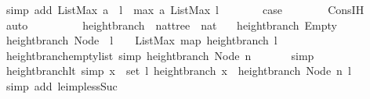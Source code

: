 \begin{isabellebody}
\ {\isacharparenleft}simp\ add{\isacharcolon}\ {\isacartoucheopen}ListMax\ {\isacharparenleft}a\ {\isacharhash}\ l{\isacharparenright}\ {\isacharequal}\ max\ a\ {\isacharparenleft}ListMax\ l{\isacharparenright}{\isacartoucheclose}{\isacharparenright}\isanewline
\ \ \ \ \isamarkupfalse%
\ \isamarkupfalse%
\ {\isacharquery}case\isanewline
\ \ \ \ \ \ \isamarkupfalse%
\ Cons{\isachardot}IH\ \isamarkupfalse%
\ auto\ \isanewline
\ \ \isamarkupfalse%
%
\endisatagproof
{\isafoldproof}%
%
\isadelimproof
\isanewline
%
\endisadelimproof
\ \ \ \ \isanewline
{}\isamarkupfalse%
\ height{\isacharunderscore}branch\ {\isacharcolon}{\isacharcolon}\ {\isachardoublequoteopen}nattree\ {\isasymRightarrow}\ nat{\isachardoublequoteclose}\ \isanewline
\ \ {\isachardoublequoteopen}height{\isacharunderscore}branch\ Empty\ {\isacharequal}\ {}{\isachardoublequoteclose}\isanewline
{\isacharbar}\ {\isachardoublequoteopen}height{\isacharunderscore}branch\ {\isacharparenleft}Node\ {\isacharunderscore}\ l{\isacharparenright}\ {\isacharequal}\ {}\ {\isacharplus}\ ListMax\ {\isacharparenleft}map\ height{\isacharunderscore}branch\ l{\isacharparenright}{\isachardoublequoteclose}\isanewline
\isanewline
{}\isamarkupfalse%
\ height{\isacharunderscore}branch{\isacharunderscore}empty{\isacharunderscore}list\ {\isacharbrackleft}simp{\isacharbrackright}{\isacharcolon}\ {\isachardoublequoteopen}height{\isacharunderscore}branch\ {\isacharparenleft}Node\ n\ {\isacharbrackleft}{\isacharbrackright}{\isacharparenright}\ {\isacharequal}\ {}{\isachardoublequoteclose}\isanewline
%
\isadelimproof
\ \ %
\endisadelimproof
%
\isatagproof
{}\isamarkupfalse%
\ simp%
\endisatagproof
{\isafoldproof}%
%
\isadelimproof
\isanewline
%
\endisadelimproof
\isanewline
{}\isamarkupfalse%
\ height{\isacharunderscore}branch{\isacharunderscore}lt\ {\isacharbrackleft}simp{\isacharbrackright}{\isacharcolon}\ {\isachardoublequoteopen}{\isasymforall}x\ {\isasymin}\ set\ l{\isachardot}\ height{\isacharunderscore}branch\ x\ {\isacharless}\ height{\isacharunderscore}branch\ {\isacharparenleft}Node\ n\ l{\isacharparenright}{\isachardoublequoteclose}\isanewline
%
\isadelimproof
\ \ %
\endisadelimproof
%
\isatagproof
{}\isamarkupfalse%
\ {\isacharparenleft}simp\ add{\isacharcolon}\ le{\isacharunderscore}imp{\isacharunderscore}less{\isacharunderscore}Suc{\isacharparenright}%
\endisatagproof
{\isafoldproof}%
%
\isadelimproof
\isanewline

\end{isabellebody}
